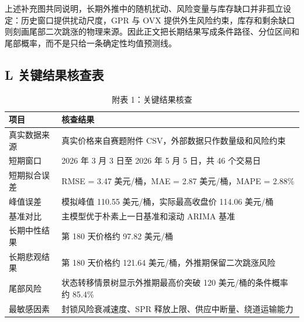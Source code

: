 

上述补充图共同说明，长期外推中的随机扰动、风险变量与库存缺口并非孤立设定：历史窗口提供扰动尺度，GPR 与 OVX 提供外生风险约束，库存和剩余缺口则刻画尾部二次跳涨的物理来源。因此正文把长期结果写成条件路径、分位区间和尾部概率，而不是只给一条确定性均值预测线。

\clearpage

\subsection*{L 关键结果核查表}

\begin{table}[!htbp]
\centering
\caption*{附表 1：关键结果核查}
\begin{tabularx}{\linewidth}{lX}
\toprule
项目 & 核查结果 \\
\midrule
真实数据来源 & 真实价格来自赛题附件 CSV，外部数据只作数量级和风险约束 \\
短期窗口 & 2026 年 3 月 3 日至 2026 年 5 月 5 日，共 46 个交易日 \\
短期拟合误差 & RMSE = 3.47 美元/桶，MAE = 2.87 美元/桶，MAPE = 2.88\% \\
峰值误差 & 模拟峰值 110.55 美元/桶，实际最高收盘价 114.06 美元/桶 \\
基准对比 & 主模型优于朴素上一日基准和滚动 ARIMA 基准 \\
长期中性结果 & 第 180 天价格约 97.82 美元/桶 \\
长期悲观结果 & 第 180 天价格约 121.64 美元/桶，外推期保留二次跳涨风险 \\
尾部风险 & 状态转移情景树显示外推期最高价突破 120 美元/桶的条件概率约 85.4\% \\
最敏感因素 & 封锁风险衰减速度、SPR 释放上限、供应中断量、绕道运输能力 \\
\bottomrule
\end{tabularx}
\end{table}
